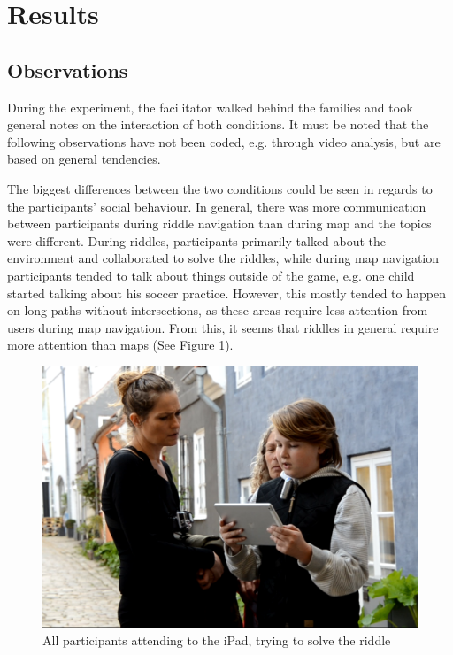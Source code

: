 \section{Results}

\subsection{Observations}
During the experiment, the facilitator walked behind the families and took general notes on the interaction of both conditions. It must be noted that the following observations have not been coded, e.g. through video analysis, but are based on general tendencies.

The biggest differences between the two conditions could be seen in regards to the participants' social behaviour. In general, there was more communication between participants during riddle navigation than during map and the topics were different. During riddles, participants primarily talked about the environment and collaborated to solve the riddles, while during map navigation participants tended to talk about things outside of the game, e.g. one child started talking about his soccer practice. However, this mostly tended to happen on long paths without intersections, as these areas require less attention from users during map navigation. From this, it seems that riddles in general require more attention than maps (See Figure \ref{Communication}). 

\begin{figure}[hbtp]
\centering
\includegraphics[scale=0.15]{Pics/exp1.png}
\caption{All participants attending to the iPad, trying to solve the riddle}
\label{Communication}
\end{figure}

